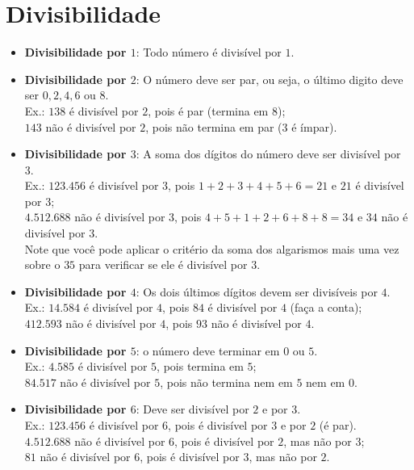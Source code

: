 \documentclass[12pt]{report}
\newcommand{\1}{\faThermometerEmpty}
\newcommand{\2}{\faThermometerQuarter}
\newcommand{\3}{\faThermometerHalf}
\newcommand{\4}{\faThermometerThreeQuarters}
\newcommand{\5}{\faThermometerFull}
\begin{document}
\section*{Divisibilidade}
\begin{itemize}
    \item \textbf{Divisibilidade por $1$}: Todo número é divisível por $1$.
    
    \item \textbf{Divisibilidade por $2$}: O número deve ser par, ou seja, o último digito deve ser $0,2,4,6$ ou $8$. \\
    Ex.: $138$ é divisível por $2$, pois é par (termina em $8$);\\
    \phantom{Ex.: }$143$ não é divisível por $2$, pois não termina em par ($3$ é ímpar).
    
    \item \textbf{Divisibilidade por $3$}: A soma dos dígitos do número deve ser divisível por 3. \\
    Ex.: $123.456$ é divisível por $3$, pois $1+2+3+4+5+6=21$ e $21$ é divisível por $3$; \\
    \phantom{Ex.: }$4.512.688$ não é divisível por $3$, pois $4+5+1+2+6+8+8=34$ e $34$ não é divisível por $3$. \\
    Note que você pode aplicar o critério da soma dos algarismos mais uma vez sobre o $35$ para verificar se ele é divisível por $3$.
    
    \item \textbf{Divisibilidade por $4$}: Os dois últimos dígitos devem ser divisíveis por $4$.\\
    Ex.: $14.584$ é divisível por $4$, pois $84$ é divisível por $4$ (faça a conta);\\
    \phantom{Ex.: }$412.593$ não é divisível por $4$, pois $93$ não é divisível por $4$.
    
    \item \textbf{Divisibilidade por $5$}: o número deve terminar em $0$ ou $5$.\\
    Ex.:  $4.585$ é divisível por $5$, pois termina em $5$;\\
    \phantom{Ex.: }$84.517$ não é divisível por $5$, pois não termina nem em $5$ nem em $0$.
   
    \item \textbf{Divisibilidade por $6$}: Deve ser divisível por $2$ e por $3$.\\
    Ex.: $123.456$ é divisível por $6$, pois é divisível por $3$ e por $2$ (é par).\\
    \phantom{Ex.: }$4.512.688$ não é divisível por $6$, pois é divisível por $2$, mas não por $3$;\\
    \phantom{Ex.: }$81$ não é divisível por $6$, pois é divisível por $3$, mas não por $2$.\\
    

\end{itemize}
\end{document}
